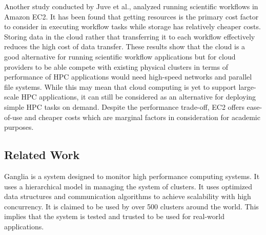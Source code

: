
         Another study conducted by Juve et al.\cite{juve_scientific_2009}, analyzed running scientific workflows in Amazon EC2. It has been found that getting resources is the primary cost factor to consider in executing workflow tasks while storage has relatively cheaper costs. Storing data in the cloud rather that transferring it to each workflow effectively reduces the high cost of data transfer. These results show that the cloud is a good alternative for running scientific workflow applications but for cloud providers to be able compete with existing physical clusters in terms of performance of HPC applications would need high-speed networks and parallel file systems\cite{WalkerEC2HPC}. While this may mean that cloud computing is yet to support large-scale HPC applications, it can still be considered as an alternative for deploying simple HPC tasks on demand\cite{PerfAnalysisManyTasks}. Despite the performance trade-off, EC2 offers ease-of-use and cheaper costs which are marginal factors in consideration for academic purposes\cite{ZachHumphrey}.  
         
         
         
         
    \subsection {Related Work}
	    Ganglia is a system designed to monitor high performance computing systems. It uses a hierarchical model in managing the system of clusters. It uses optimized data structures and communication algorithms to achieve scalability with high concurrency. It is claimed to be used by over 500 clusters around the world. This implies that the system is tested and trusted to be used for real-world applications\cite{1395654820040701}.
	    
